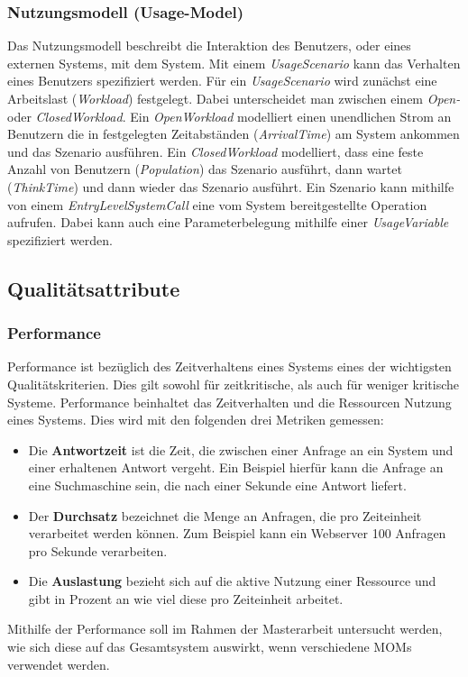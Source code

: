 \subsubsection*{Nutzungsmodell (Usage-Model)}
Das Nutzungsmodell beschreibt die Interaktion des Benutzers, oder eines externen Systems, mit dem System. Mit einem \emph{UsageScenario} kann das Verhalten eines Benutzers spezifiziert werden. Für ein \emph{UsageScenario} wird zunächst eine Arbeitslast (\emph{Workload}) festgelegt. Dabei unterscheidet man zwischen einem \emph{Open-} oder \emph{ClosedWorkload}. Ein \emph{OpenWorkload} modelliert einen unendlichen Strom an Benutzern die in festgelegten Zeitabständen (\emph{ArrivalTime}) am System ankommen und das Szenario ausführen. Ein \emph{ClosedWorkload} modelliert, dass eine feste Anzahl von Benutzern (\emph{Population}) das Szenario ausführt, dann  wartet (\emph{ThinkTime}) und dann wieder das Szenario ausführt. Ein Szenario kann mithilfe von einem \emph{EntryLevelSystemCall} eine vom System bereitgestellte Operation aufrufen. Dabei kann auch eine Parameterbelegung mithilfe einer \emph{UsageVariable} spezifiziert werden. 
\subsection{Qualitätsattribute}
\subsubsection{Performance} 
Performance ist bezüglich des Zeitverhaltens eines Systems eines der wichtigsten Qualitätskriterien. Dies gilt sowohl für zeitkritische, als auch für weniger kritische Systeme. Performance beinhaltet das Zeitverhalten und die Ressourcen Nutzung eines Systems. Dies wird mit den folgenden drei Metriken gemessen:
\begin{itemize}
\item Die \textbf{Antwortzeit} ist die Zeit, die zwischen einer Anfrage an ein System und einer erhaltenen Antwort vergeht. Ein Beispiel hierfür kann die Anfrage an eine Suchmaschine sein, die nach einer Sekunde eine Antwort liefert.
\item Der \textbf{Durchsatz} bezeichnet die Menge an Anfragen, die pro Zeiteinheit verarbeitet werden können. Zum Beispiel kann ein Webserver 100 Anfragen pro Sekunde verarbeiten.
\item Die \textbf{Auslastung} bezieht sich auf die aktive Nutzung einer Ressource und gibt in Prozent an wie viel diese pro Zeiteinheit arbeitet. 
\end{itemize}
Mithilfe der Performance soll im Rahmen der Masterarbeit untersucht werden, wie sich diese auf das Gesamtsystem auswirkt, wenn verschiedene MOMs verwendet werden.

